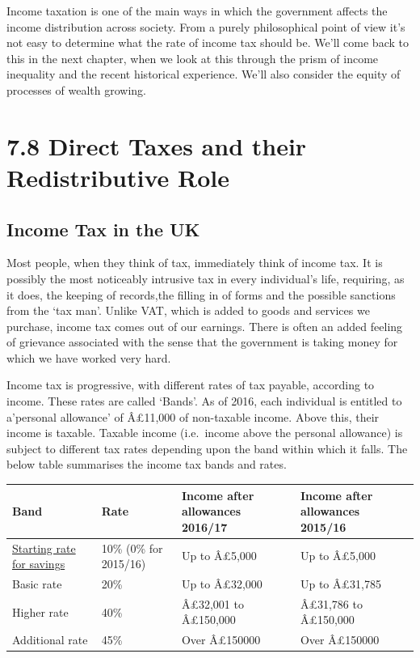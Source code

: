\documentclass[]{tufte-handout}
\begin{document}
Income taxation is one of the main ways in which the government affects
the income distribution across society. From a purely philosophical
point of view it's not easy to determine what the rate of income tax
should be. We'll come back to this in the next chapter, when we look at
this through the prism of income inequality and the recent historical
experience. We'll also consider the equity of processes of wealth
growing.

\hypertarget{direct-taxes-and-their-redistributive-role}{%
\section{7.8 Direct Taxes and their Redistributive
Role}\label{direct-taxes-and-their-redistributive-role}}

\hypertarget{income-tax-in-the-uk}{%
\subsection{Income Tax in the UK}\label{income-tax-in-the-uk}}

Most people, when they think of tax, immediately think of income tax. It
is possibly the most noticeably intrusive tax in every individual's
life, requiring, as it does, the keeping of records,the filling in of
forms and the possible sanctions from the `tax man'. Unlike VAT, which
is added to goods and services we purchase, income tax comes out of our
earnings. There is often an added feeling of grievance associated with
the sense that the government is taking money for which we have worked
very hard.

Income tax is progressive, with different rates of tax payable,
according to income. These rates are called `Bands'. As of 2016, each
individual is entitled to a'personal allowance' of Â£11,000 of
non-taxable income. Above this, their income is taxable. Taxable income
(i.e.~income above the personal allowance) is subject to different tax
rates depending upon the band within which it falls. The below table
summarises the income tax bands and rates.

\begin{longtable}[]{@{}llll@{}}
\toprule
Band & Rate & Income after allowances 2016/17 & Income after allowances
2015/16\tabularnewline
\midrule
\endhead
\href{http://www.gov.uk/apply-tax-free-interest-on-savings/10-savings-rate}{Starting
rate for savings} & 10\% (0\% for 2015/16) & Up to Â£5,000 & Up to
Â£5,000\tabularnewline
Basic rate & 20\% & Up to Â£32,000 & Up to Â£31,785\tabularnewline
Higher rate & 40\% & Â£32,001 to Â£150,000 & Â£31,786 to
Â£150,000\tabularnewline
Additional rate & 45\% & Over Â£150000 & Over Â£150000\tabularnewline
\bottomrule
\end{longtable}
\end{document}
